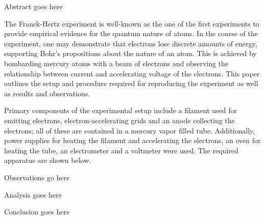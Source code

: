 
\physics

\begin{paperabs}

	Abstract goes here
	
\end{paperabs}

\begin{paper}
	
	
	The Franck-Hertz experiment is well-known as the one of the first experiments to provide empirical evidence for the quantum nature of atoms. In the course of the experiment, one may demonstrate that electrons lose discrete amounts of energy, supporting Bohr's propositions about the nature of an atom. This is achieved by bombarding mercury atoms with a beam of electrons and observing the relationship between current and accelerating voltage of the electrons. This paper outlines the setup and procedure required for reproducing the experiment as well as results and observations. 
	
	Primary components of the experimental setup include a filament used for emitting electrons, electron-accelerating grids and an anode collecting the electrons; all of these are contained in a mercury vapor filled tube. Additionally, power supplies for heating the filament and accelerating the electrons, an oven for heating the tube, an electrometer and a voltmeter were used. The required apparatus are shown below.
	

	

	
	Observations go here
	
	
	Analysis goes here
	

	Conclusion goes here
	


\end{paper}
